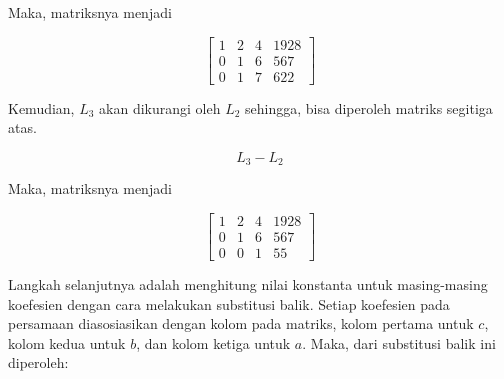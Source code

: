 \begin{flushleft}
	Maka, matriksnya menjadi
\end{flushleft}

\begin{center}
	\setlength\arraycolsep{15pt}
	\[
	\begin{bmatrix}
			1 & 	2 & 	4  & 	1928 	\\[1em]
			0 & 	1 & 	6 & 	567 	\\[1em]
			0 & 	1 & 	7 & 	622
	\end{bmatrix}
	\]
\end{center}

\begin{flushleft}
	Kemudian, \begin{math}L_3\end{math} akan dikurangi oleh \begin{math}L_2\end{math} sehingga, bisa diperoleh matriks segitiga atas.
\end{flushleft}

\begin{center}
	\begin{displaymath}
		L_3 - L_2
	\end{displaymath}
\end{center}

\begin{flushleft}
	Maka, matriksnya menjadi
\end{flushleft}

\begin{center}
	\setlength\arraycolsep{15pt}
	\[
	\begin{bmatrix}
			1 & 	2 & 	4  & 	1928 	\\[1em]
			0 & 	1 & 	6 & 	567 	\\[1em]
			0 & 	0 & 	1 & 	55
	\end{bmatrix}
	\]
\end{center}

Langkah selanjutnya adalah menghitung nilai konstanta untuk masing-masing koefesien dengan cara melakukan substitusi balik. Setiap koefesien pada persamaan diasosiasikan dengan kolom pada matriks, kolom pertama untuk \begin{math}c\end{math}, kolom kedua untuk \begin{math}b\end{math}, dan kolom ketiga untuk \begin{math}a\end{math}. Maka, dari substitusi balik ini diperoleh:

